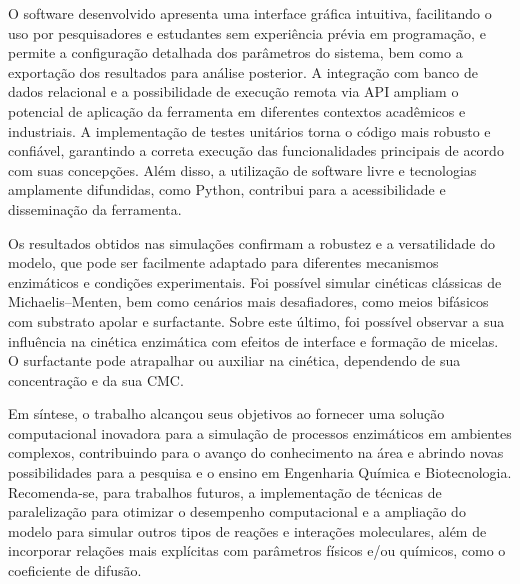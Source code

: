 \documentclass[12pt,oneside]{report}
\begin{document}
O software desenvolvido apresenta uma interface gráfica intuitiva, facilitando o uso por pesquisadores e estudantes sem experiência prévia em programação, e permite a configuração detalhada dos parâmetros do sistema, bem como a exportação dos resultados para análise posterior. A integração com banco de dados relacional e a possibilidade de execução remota via API ampliam o potencial de aplicação da ferramenta em diferentes contextos acadêmicos e industriais. A implementação de testes unitários torna o código mais robusto e confiável, garantindo a correta execução das funcionalidades principais de acordo com suas concepções. Além disso, a utilização de software livre e tecnologias amplamente difundidas, como Python, contribui para a acessibilidade e disseminação da ferramenta.

Os resultados obtidos nas simulações confirmam a robustez e a versatilidade do modelo, que pode ser facilmente adaptado para diferentes mecanismos enzimáticos e condições experimentais. Foi possível simular cinéticas clássicas de Michaelis--Menten, bem como cenários mais desafiadores, como meios bifásicos com substrato apolar e surfactante. Sobre este último, foi possível observar a sua influência na cinética enzimática com efeitos de interface e formação de micelas. O surfactante pode atrapalhar ou auxiliar na cinética, dependendo de sua concentração e da sua CMC.

Em síntese, o trabalho alcançou seus objetivos ao fornecer uma solução computacional inovadora para a simulação de processos enzimáticos em ambientes complexos, contribuindo para o avanço do conhecimento na área e abrindo novas possibilidades para a pesquisa e o ensino em Engenharia Química e Biotecnologia. Recomenda-se, para trabalhos futuros, a implementação de técnicas de paralelização para otimizar o desempenho computacional e a ampliação do modelo para simular outros tipos de reações e interações moleculares, além de incorporar relações mais explícitas com parâmetros físicos e/ou químicos, como o coeficiente de difusão.

\printbibliography[title={REFERÊNCIAS},heading=bibnumbered]
\end{document}
